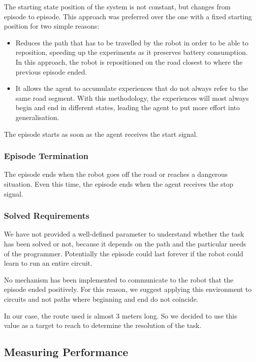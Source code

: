 The starting state position of the system is not constant, but changes from episode to episode.
This approach was preferred over the one with a fixed starting position for two simple reasons:
\begin{itemize}
    \item Reduces the path that has to be travelled by the robot in order to be able to reposition, speeding up the experiments as it preserves battery consumption.
          In this approach, the robot is repositioned on the road closest to where the previous episode ended.
    \item It allows the agent to accumulate experiences that do not always refer to the same road segment.
          With this methodology, the experiences will most always begin and end in different states, leading the agent to put more effort into generalisation.
\end{itemize}

The episode starts as soon as the agent receives the start signal.

\subsubsection{Episode Termination}

The episode ends when the robot goes off the road or reaches a dangerous situation.
Even this time, the episode ends when the agent receives the stop signal.

\subsubsection{Solved Requirements}

We have not provided a well-defined parameter to understand whether the task has been solved or not, because it depends on the path and the particular needs of the programmer.
Potentially the episode could last forever if the robot could learn to run an entire circuit.

No mechanism has been implemented to communicate to the robot that the episode ended positively.
For this reason, we suggest applying this environment to circuits and not paths where beginning and end do not coincide.

In our case, the route used is almost 3 meters long.
So we decided to use this value as a target to reach to determine the resolution of the task.

\subsection{Measuring Performance}

